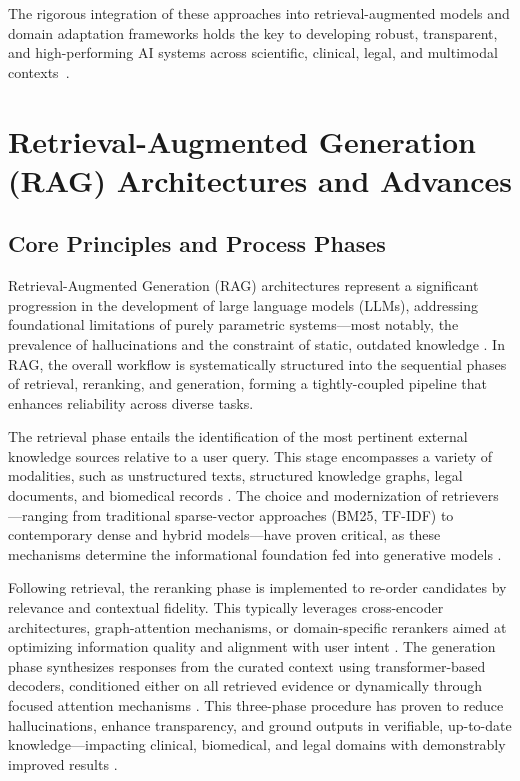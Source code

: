 \documentclass[sigconf]{acmart}
\begin{document}
The rigorous integration of these approaches into retrieval-augmented models and domain adaptation frameworks holds the key to developing robust, transparent, and high-performing AI systems across scientific, clinical, legal, and multimodal contexts~\cite{ref5,ref10,ref12,ref15,ref16,ref22,ref24,ref31,ref32,ref36,ref37,ref43,ref48,ref49,ref52,ref54,ref55,ref61,ref62,ref57}.

\section{Retrieval-Augmented Generation (RAG) Architectures and Advances}

\subsection{Core Principles and Process Phases}

Retrieval-Augmented Generation (RAG) architectures represent a significant progression in the development of large language models (LLMs), addressing foundational limitations of purely parametric systems—most notably, the prevalence of hallucinations and the constraint of static, outdated knowledge \cite{ref4, ref5, ref8, ref10, ref14, ref15, ref16, ref17, ref35, ref36, ref37, ref42, ref52, ref54, ref55, ref64}. In RAG, the overall workflow is systematically structured into the sequential phases of retrieval, reranking, and generation, forming a tightly-coupled pipeline that enhances reliability across diverse tasks.

The retrieval phase entails the identification of the most pertinent external knowledge sources relative to a user query. This stage encompasses a variety of modalities, such as unstructured texts, structured knowledge graphs, legal documents, and biomedical records \cite{ref42, ref49, ref51, ref52, ref54, ref55, ref63}. The choice and modernization of retrievers—ranging from traditional sparse-vector approaches (BM25, TF-IDF) to contemporary dense and hybrid models—have proven critical, as these mechanisms determine the informational foundation fed into generative models \cite{ref10, ref35, ref52, ref54}.

Following retrieval, the reranking phase is implemented to re-order candidates by relevance and contextual fidelity. This typically leverages cross-encoder architectures, graph-attention mechanisms, or domain-specific rerankers aimed at optimizing information quality and alignment with user intent \cite{ref4, ref36, ref37}. The generation phase synthesizes responses from the curated context using transformer-based decoders, conditioned either on all retrieved evidence or dynamically through focused attention mechanisms \cite{ref5, ref16, ref17, ref37}. This three-phase procedure has proven to reduce hallucinations, enhance transparency, and ground outputs in verifiable, up-to-date knowledge—impacting clinical, biomedical, and legal domains with demonstrably improved results \cite{ref64}.
\end{document}
